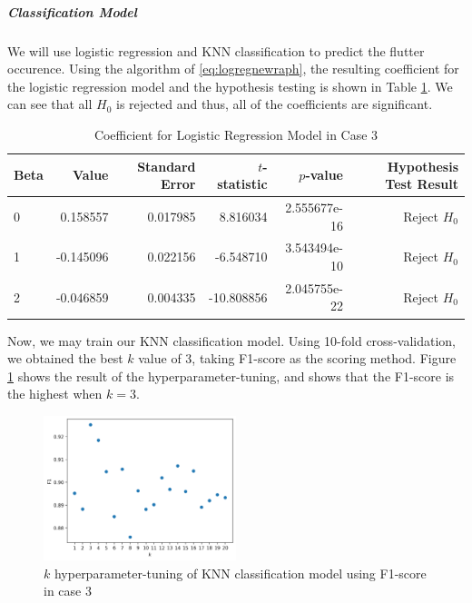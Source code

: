 \documentclass[conf]{new-aiaa}
\begin{document}
\subparagraph{Classification Model} We will use logistic regression and KNN classification to predict the flutter occurence. Using the algorithm of \eqref{eq:logregnewraph}, the resulting coefficient for the logistic regression model and the hypothesis testing is shown in Table \ref{tab:case3_logit_coef}. We can see that all $H_0$ is rejected and thus, all of the coefficients are significant. 
\begin{table}[H]
    \centering
    \caption{\label{tab:case3_logit_coef}Coefficient for Logistic Regression Model in Case 3}
    \begin{tabular}{lrrrrr}
        \toprule
        Beta &      Value &  Standard Error &  $t$-statistic &       $p$-value & Hypothesis Test Result \\
        \midrule
        0 &  0.158557 &        0.017985 &     8.816034 &  2.555677e-16 &              Reject $H_0$ \\
        1 & -0.145096 &        0.022156 &    -6.548710 &  3.543494e-10 &              Reject $H_0$ \\
        2 & -0.046859 &        0.004335 &   -10.808856 &  2.045755e-22 &              Reject $H_0$ \\
        \bottomrule
    \end{tabular}
\end{table}
Now, we may train our KNN classification model. Using 10-fold cross-validation, we obtained the best $k$ value of 3, taking F1-score as the scoring method. Figure \ref{fig:case3_knnc_f1} shows the result of the hyperparameter-tuning, and shows that the F1-score is the highest when $k=3$. 
\begin{figure}
    \centering
    \includegraphics[width=0.5\textwidth]{graph/case3_knnc_f1.png}
    \caption{$k$ hyperparameter-tuning of KNN classification model using F1-score in case 3}
    \label{fig:case3_knnc_f1}
\end{figure}
\end{document}
